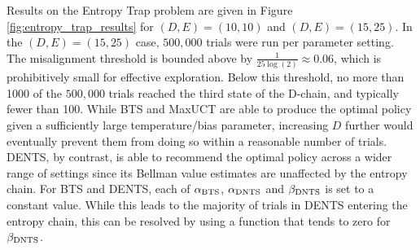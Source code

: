     Results on the Entropy Trap problem are given in Figure \ref{fig:entropy_trap_results} for $(D,E)=(10,10)$ and $(D,E)=(15,25)$. In the $(D,E)=(15,25)$ case, $500{,}000$ trials were run per parameter setting. The misalignment threshold is bounded above by $\frac{1}{25\log(2)}\approx 0.06$, which is prohibitively small for effective exploration. Below this threshold, no more than 1000 of the $500{,}000$ trials reached the third state of the D-chain, and typically fewer than 100. While BTS and MaxUCT are able to produce the optimal policy given a sufficiently large temperature/bias parameter, increasing $D$ further would eventually prevent them from doing so within a reasonable number of trials. DENTS, by contrast, is able to recommend the optimal policy across a wider range of settings since its Bellman value estimates are unaffected by the entropy chain. For BTS and DENTS, each of ${\alpha_{{\textnormal{BTS}}}}$, ${\alpha_{{\textnormal{DNTS}}}}$ and ${\beta_{{\textnormal{DNTS}}}}$ is set to a constant value. While this leads to the majority of trials in DENTS entering the entropy chain, this can be resolved by using a function that tends to zero for ${\beta_{{\textnormal{DNTS}}}}$.

